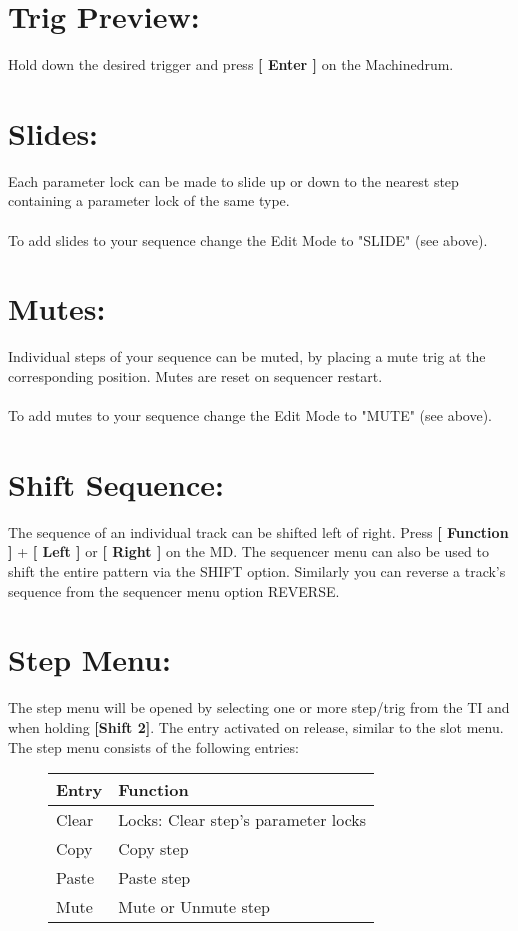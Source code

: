 \section{Trig Preview:}
Hold down the desired trigger and press \textbf{[ Enter ]} on the Machinedrum.
\section{Slides:}
Each parameter lock can be made to slide up or down to the nearest step containing a parameter lock of the same type.
\\\\
To add slides to your sequence change the Edit Mode to "SLIDE" (see above).
\section{Mutes:}
Individual steps of your sequence can be muted, by placing a mute trig at the corresponding position. Mutes are reset on sequencer restart.\\\\ 
To add mutes to your sequence change the Edit Mode to "MUTE" (see above).
\section{Shift Sequence:}
The sequence of an individual track can be shifted left of right. Press \textbf{[ Function ]} + \textbf{[ Left ]} or \textbf{[ Right ]} on the MD. The sequencer menu can also be used to shift the entire pattern via the SHIFT option.
Similarly you can reverse a track's sequence from the sequencer menu option REVERSE.
\section{Step Menu:}

The step menu will be opened by selecting one or more step/trig from the TI and when holding \textbf{[Shift 2]}. The entry activated on release, similar to the slot menu.
The step menu consists of the following entries:

\begin{figure}[hb]
    \begin{tabular}{|l|l|}
    \hline
    \rowcolor[HTML]{C0C0C0} 
    Entry            & Function \\ \hline
    Clear            & Locks: Clear step's parameter locks \\ \hline
    Copy         & Copy step\\ \hline
    Paste        & Paste step\\ \hline
    Mute         & Mute or Unmute step\\ \hline
    \end{tabular}
\end{figure}